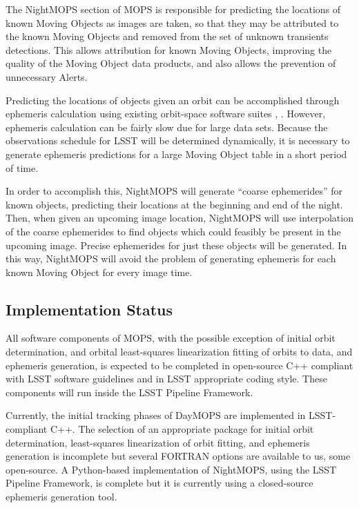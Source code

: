 \documentclass[12pt,preprint]{aastex}
\begin{document}
The NightMOPS section of MOPS is responsible for predicting the
locations of known Moving Objects as images are taken, so that they
may be attributed to the known Moving Objects and removed from the set
of unknown transients detections.  This allows attribution for known
Moving Objects, improving the quality of the Moving Object data
products, and also allows the prevention of unnecessary Alerts.

Predicting the locations of objects given an orbit can be accomplished
through ephemeris calculation using existing orbit-space software
suites \citep{Milani2006}, \citep{OpenOrb2009}.  However, ephemeris
calculation can be fairly slow due for large data sets.  Because the
observations schedule for LSST will be determined dynamically, it is
necessary to generate ephemeris predictions for a large Moving Object
table in a short period of time.


In order to accomplish this, NightMOPS will generate ``coarse
ephemerides'' for known objects, predicting their locations at the
beginning and end of the night.  Then, when given an upcoming image
location, NightMOPS will use interpolation of the coarse ephemerides
to find objects which could feasibly be present in the upcoming
image. Precise ephemerides for just these objects will be
generated. In this way, NightMOPS will avoid the problem of generating
ephemeris for each known Moving Object for every image time.


\subsection{Implementation Status}

All software components of MOPS, with the possible exception of
initial orbit determination, and orbital least-squares linearization
fitting of orbits to data, and ephemeris generation, is expected to be
completed in open-source C++ compliant with LSST software guidelines
and in LSST appropriate coding style.  These components will run
inside the LSST Pipeline Framework.  

Currently, the initial tracking phases of DayMOPS are implemented in
LSST-compliant C++.  The selection of an appropriate package for
initial orbit determination, least-squares linearization of orbit
fitting, and ephemeris generation is incomplete but several FORTRAN
options are available to us, some open-source.  A Python-based
implementation of NightMOPS, using the LSST Pipeline Framework, is
complete but it is currently using a closed-source ephemeris
generation tool.
\end{document}
